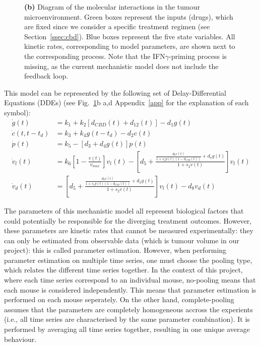 \documentclass[11pt]{article}
\begin{document}
\begin{figure}[!ht]
{    \textbf{(b)} Diagram of the molecular interactions in the tumour microenvironment. Green boxes represent the inputs (drugs), which are fixed since we consider a specific treatment regimen (see Section~\ref{ssec:cbd}). Blue boxes represent the five state variables. All kinetic rates, corresponding to model parameters, are shown next to the corresponding process. Note that the IFN$\gamma$-priming process is missing, as the current mechanistic model does not include the feedback loop.}
    \label{fig:mech}
\end{figure}

This model can be represented by the following set of Delay-Differential Equations (DDEs) \cite{takuya} (see Fig.~\ref{fig:mech}b a,d Appendix~\ref{app} for the explanation of each symbol): 
\begin{align*}
    \dot{g}(t) &= k_1 + k_2 [d_{CBD}(t) + d_{12}(t)] - d_1g(t) \\ 
    \dot{c}(t,t-t_d) &= k_3 + k_4g(t-t_d)-d_2c(t) \\ 
    \dot{p}(t) &= k_5 - [d_3 + d_4g(t)]p(t) \\ 
    \dot{v}_l(t) &= k_6\left[1 - \frac{v(t)}{v_{max}} \right]v_l(t) - \left[d_5 + \frac{\frac{d_6c(t)}{1+s_1p(t)(1-d_{CPI}(t))}+d_7g(t)}{1+s_2v(t)}\right]v_l(t)\\
    \dot{v}_d(t) &= \left[d_5 + \frac{\frac{d_6c(t)}{1+s_1p(t)(1-d_{CPI}(t))}+d_7g(t)}{1+s_2v(t)}\right]v_l(t) - d_8 v_d(t)
\end{align*}

The parameters of this mechanistic model all represent biological factors that could potentially be responsible for the diverging treatment outcomes. However, these parameters are kinetic rates that cannot be measured experimentally: they can only be estimated from observable data (which is tumour volume in our project): this is called parameter estimation. However, when performing parameter estimation on multiple time series, one must choose the pooling type, which relates the different time series together. In the context of this project, where each time series correspond to an individual mouse, no-pooling means that each mouse is considered independently. This means that parameter estimation is performed on each mouse seperately. On the other hand, complete-pooling assumes that the parameters are completely homogeneous accross the experients (i.e., all time series are characterised by the same parameter combination). It is performed by averaging all time series together, resulting in one unique average behaviour. 
\end{document}
